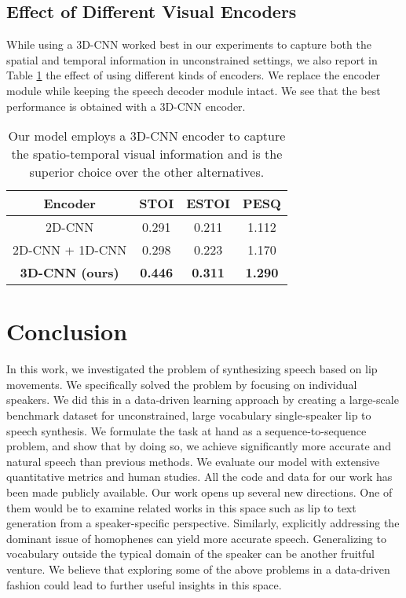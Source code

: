 \documentclass[10pt,twocolumn,letterpaper]{article}
\begin{document}
\subsection{Effect of Different Visual Encoders}
While using a 3D-CNN worked best in our experiments to capture both the spatial and temporal information in unconstrained settings, we also report in Table \ref{tab:diffencoders} the effect of using different kinds of encoders. We replace the encoder module while keeping the speech decoder module intact. We see that the best performance is obtained with a 3D-CNN encoder.

\begin{table}[h]
\centering
 \begin{tabular}{|c||c|c|c|}
    \hline
    Encoder & STOI & ESTOI & PESQ \\
    \hline
    2D-CNN & 0.291 & 0.211 & 1.112\\
    2D-CNN + 1D-CNN & 0.298 & 0.223 & 1.170 \\
    \textbf{3D-CNN (ours)} &\textbf{0.446} & \textbf{0.311} & \textbf{1.290}\\
  \hline
\end{tabular}
    \vspace{.2cm}
    \caption{Our \modelname model employs a 3D-CNN encoder to capture the spatio-temporal visual information and is the superior choice over the other alternatives.}
    \label{tab:diffencoders}
\end{table}

\section{Conclusion}
\label{section:conclusion}
In this work, we investigated the problem of synthesizing speech based on lip movements. We specifically solved the problem by focusing on individual speakers. We did this in a data-driven learning approach by creating a large-scale benchmark dataset for unconstrained, large vocabulary single-speaker lip to speech synthesis. We formulate the task at hand as a sequence-to-sequence problem, and show that by doing so, we achieve significantly more accurate and natural speech than previous methods. We evaluate our model with extensive quantitative metrics and human studies. All the code and data for our work has been made publicly available\footnotemark[2]. Our work opens up several new directions. One of them would be to examine related works in this space such as lip to text generation from a speaker-specific perspective. Similarly, explicitly addressing the dominant issue of homophenes can yield more accurate speech. Generalizing to vocabulary outside the typical domain of the speaker can be another fruitful venture. We believe that exploring some of the above problems in a data-driven fashion could lead to further useful insights in this space.

{\small


}
\end{document}

